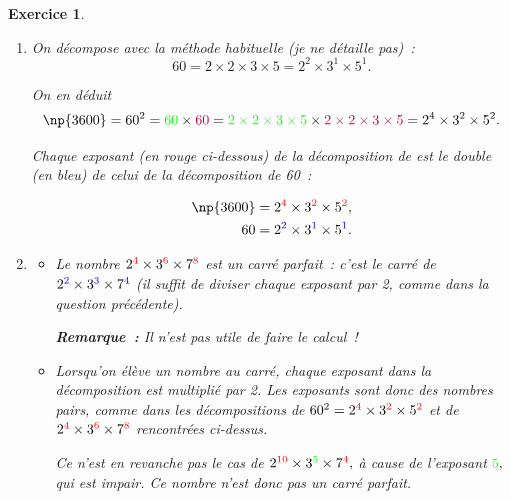 \documentclass[10pt]{article}
\newtheorem{exo}{Exercice}
\begin{document}
\begin{exo}

\begin{enumerate}
\item On décompose avec la méthode habituelle (je ne détaille pas)~:
\[60=2\times 2\times 3\times 5=2^2\times 3^1\times 5^1.\]

On en déduit
\[\np{3600}=60^2=\textcolor{green}{60}\times \textcolor{purple}{60}=\textcolor{green}{2\times 2\times 3\times 5}\times \textcolor{purple}{2\times 2\times 3\times 5}=2^4\times 3^2\times 5^2.\]

\medskip

Chaque exposant (en rouge ci-dessous) de la décomposition de  est le double (en bleu) de celui de la décomposition de 60~:

\begin{align*}
\np{3600}&=2^{\textcolor{red}{4}}\times 3^{\textcolor{red}{2}}\times 5^{\textcolor{red}{2}},\\
60&=2^{\textcolor{blue}{2}}\times 3^{\textcolor{blue}{1}}\times 5^{\textcolor{blue}{1}}.
\end{align*}

\item \begin{itemize}
\item[\textbullet] Le nombre $2^{\textcolor{red}{4}}\times 3^{\textcolor{red}{6}}\times 7^{\textcolor{red}{8}}$ est un carré parfait~: c'est le carré de $2^{\textcolor{blue}{2}}\times 3^{\textcolor{blue}{3}}\times 7^{\textcolor{blue}{4}}$ (il suffit de diviser chaque exposant par 2, comme dans la question précédente).

\medskip

\textbf{Remarque~:} Il n'est pas utile de faire le calcul~!

\item[\textbullet] Lorsqu'on élève un nombre au carré, chaque exposant dans la décomposition est multiplié par 2. Les exposants sont donc des nombres pairs, comme dans les décompositions de $60^2=2^{\textcolor{red}{4}}\times 3^{\textcolor{red}{2}}\times 5^{\textcolor{red}{2}}$ et de $2^{\textcolor{red}{4}}\times 3^{\textcolor{red}{6}}\times 7^{\textcolor{red}{8}}$ rencontrées ci-dessus.

\medskip

Ce n'est en revanche pas le cas de $2^{\textcolor{red}{10}}\times 3^{\textcolor{green}{5}}\times 7^{\textcolor{red}{4}},$ à cause de l'exposant $\textcolor{green}{5},$ qui est impair. Ce nombre n'est donc pas un carré parfait.


\end{itemize}
\end{enumerate}
\end{exo}
\end{document}
